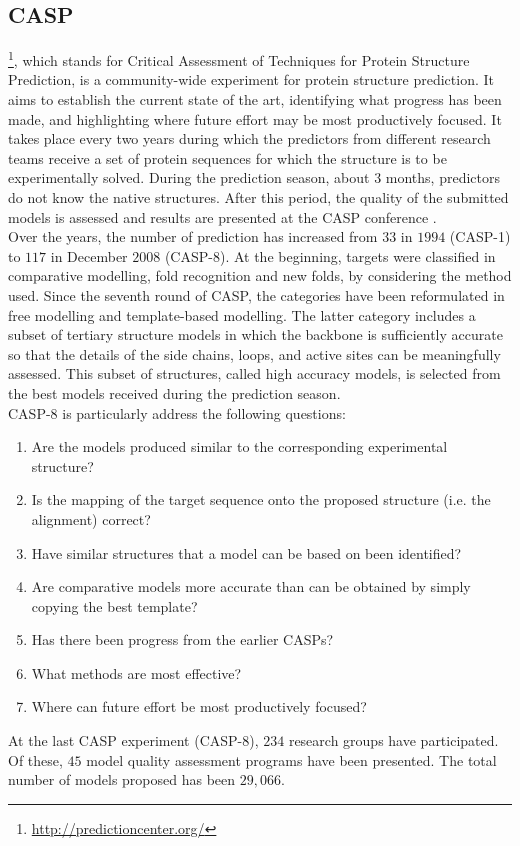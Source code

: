 \subsection{CASP}
\label{subsec:casp}
\footnote{\href{http://predictioncenter.org/}{http://predictioncenter.org/}}, which stands for Critical Assessment of Techniques for Protein Structure Prediction, is a community-wide experiment for protein structure prediction. It aims to establish the current state of the art, identifying what progress has been made, and highlighting where future effort may be most productively focused. It takes place every two years during which the predictors from different research teams receive a set of protein sequences for which the structure is to be experimentally solved. During the prediction season, about $3$ months, predictors do not know the native structures. After this period, the quality of the submitted models is assessed and results are presented at the CASP conference \cite{Zemla2001aa}.\\
Over the years, the number of prediction  has increased from $33$ in $1994$ (CASP-1) to $117$ in December $2008$ (CASP-8). At the beginning, targets were classified in comparative modelling, fold recognition and new folds, by considering the method used. Since the seventh round of CASP, the categories have been reformulated in free modelling and template-based modelling. The latter category includes a subset of tertiary structure models in which the backbone is sufficiently accurate so that the details of the side chains, loops, and active sites can be meaningfully assessed. This subset of structures, called high accuracy models, is selected from the best models received during the prediction season.\\
CASP-8 is particularly address the following questions:
\begin{enumerate}
\item Are the models produced similar to the corresponding experimental structure?
\item Is the mapping of the target sequence onto the proposed structure (i.e. the alignment) correct?
\item Have similar structures that a model can be based on been identified?
\item Are comparative models more accurate than can be obtained by simply copying the best template?
\item Has there been progress from the earlier CASPs?
\item What methods are most effective?
\item Where can future effort be most productively focused?
\end{enumerate}
At the last CASP experiment (CASP-8), $234$ research groups have participated. Of these, $45$ model quality assessment programs have been presented. The total number of models proposed has been $29,066$.

